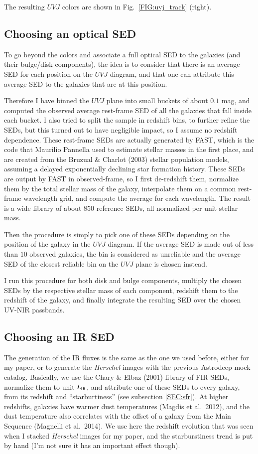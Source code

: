 \documentclass[12pt,a4paper]{article}
\newcommand{\rfig}[1]{Fig.~\ref{#1}}
\newcommand{\rsec}[1]{subsection \ref{#1}}
\newcommand{\herschel}{{\it Herschel}\xspace}
\newcommand{\lir}{L_{\rm IR}}
\newcommand{\uvj}{$UVJ$\xspace}
\begin{document}
The resulting \uvj colors are shown in \rfig{FIG:uvj_track} (right).


\subsection{Choosing an optical SED}

To go beyond the colors and associate a full optical SED to the galaxies (and their bulge/disk components), the idea is to consider that there is an average SED for each position on the \uvj diagram, and that one can attribute this average SED to the galaxies that are at this position.

Therefore I have binned the \uvj plane into small buckets of about $0.1$ mag, and computed the observed average rest-frame SED of all the galaxies that fall inside each bucket. I also tried to split the sample in redshift bins, to further refine the SEDs, but this turned out to have negligible impact, so I assume no redshift dependence. These rest-frame SEDs are actually generated by FAST, which is the code that Maurilio Pannella used to estimate stellar masses in the first place, and are created from the Bruzual \& Charlot (2003) stellar population models, assuming a delayed exponentially declining star formation history. These SEDs are output by FAST in observed-frame, so I first de-redshift them, normalize them by the total stellar mass of the galaxy, interpolate them on a common rest-frame wavelength grid, and compute the average for each wavelength. The result is a wide library of about $850$ reference SEDs, all normalized per unit stellar mass.

Then the procedure is simply to pick one of these SEDs depending on the position of the galaxy in the \uvj diagram. If the average SED is made out of less than $10$ observed galaxies, the bin is considered as unreliable and the average SED of the closest reliable bin on the \uvj plane is chosen instead.

I run this procedure for both disk and bulge components, multiply the chosen SEDs by the respective stellar mass of each component, redshift them to the redshift of the galaxy, and finally integrate the resulting SED over the chosen UV-NIR passbands.


\subsection{Choosing an IR SED}

The generation of the IR fluxes is the same as the one we used before, either for my paper, or to generate the \herschel images with the previous Astrodeep mock catalog. Basically, we use the Chary \& Elbaz (2001) library of FIR SEDs, normalize them to unit $\lir$, and attribute one of these SEDs to every galaxy, from its redshift and ``starburtiness'' (see \rsec{SEC:sfr}). At higher redshifts, galaxies have warmer dust temperatures (Magdis et al.~2012), and the dust temperature also correlates with the offset of a galaxy from the Main Sequence (Magnelli et al.~2014). We use here the redshift evolution that was seen when I stacked \herschel images for my paper, and the starburstiness trend is put by hand (I'm not sure it has an important effect though).
\end{document}
